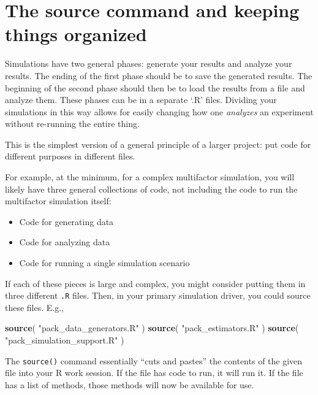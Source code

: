 \documentclass[
]{book}
\newenvironment{Shaded}{\begin{snugshade}}{\end{snugshade}}
\newcommand{\FunctionTok}[1]{\textcolor[rgb]{0.13,0.29,0.53}{\textbf{#1}}}
\newcommand{\NormalTok}[1]{#1}
\newcommand{\StringTok}[1]{\textcolor[rgb]{0.31,0.60,0.02}{#1}}
\providecommand{\tightlist}{%
  \setlength{\itemsep}{0pt}\setlength{\parskip}{0pt}}
\begin{document}
\section{The source command and keeping things organized}\label{the-source-command-and-keeping-things-organized}

Simulations have two general phases: generate your results and analyze your results.
The ending of the first phase should be to save the generated results.
The beginning of the second phase should then be to load the results from a file and analyze them.
These phases can be in a separate `.R' files.
Dividing your simulations in this way allows for easily changing how one \emph{analyzes} an experiment without re-running the entire thing.

This is the simplest version of a general principle of a larger project: put code for different purposes in different files.

For example, at the minimum, for a complex multifactor simulation, you will likely have three general collections of code, not including the code to run the multifactor simulation itself:

\begin{itemize}
\tightlist
\item
  Code for generating data
\item
  Code for analyzing data
\item
  Code for running a single simulation scenario
\end{itemize}

If each of these pieces is large and complex, you might consider putting them in three different \texttt{.R} files.
Then, in your primary simulation driver, you could source these files.
E.g.,

\begin{Shaded}
\begin{Highlighting}[]
\FunctionTok{source}\NormalTok{( }\StringTok{"pack\_data\_generators.R"}\NormalTok{ )}
\FunctionTok{source}\NormalTok{( }\StringTok{"pack\_estimators.R"}\NormalTok{ )}
\FunctionTok{source}\NormalTok{( }\StringTok{"pack\_simulation\_support.R"}\NormalTok{ )}
\end{Highlighting}
\end{Shaded}

The \texttt{source()} command essentially ``cuts and pastes'' the contents of the given file into your R work session.
If the file has code to run, it will run it.
If the file has a list of methods, those methods will now be available for use.
\end{document}
